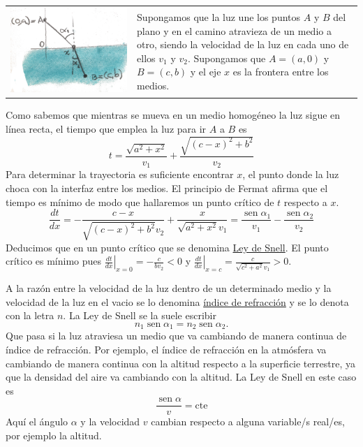 \documentclass{article}
\DeclareMathOperator{\sen}{sen}
\begin{document}
\begin{tabular}{m{4cm} m{7.5cm}}
 \includegraphics[scale=.07]{imagenes/refraccion.jpg} & Supongamos que la luz une los puntos $A$ y $B$ del plano y en el camino atravieza de un medio a otro, siendo la velocidad
 de la luz en cada uno de ellos $v_1$ y $v_2$.  Supongamos que $A=(a,0)$ y $B=(c,b)$ y el eje $x$ es la frontera entre los medios.
 \end{tabular}
Como sabemos que mientras se mueva en un medio homogéneo la luz sigue en línea recta,
el tiempo que emplea la luz para ir $A$ a $B$ es
 \[t=\frac{\sqrt{a^{2} + x^{2}}}{v_{1}} + \frac{\sqrt{{\left(c - x\right)}^{2} + b^{2}}}{v_{2}}\]
Para determinar la trayectoria es suficiente encontrar $x$, el punto donde la luz choca con la interfaz entre los medios. 
El principio de Fermat afirma que el tiempo es mínimo de modo que hallaremos un punto crítico de $t$ respecto a $x$. 
\[ \frac{dt}{dx}=-\frac{c - x}{\sqrt{{\left(c - x\right)}^{2} + b^{2}} v_{2}} +
\frac{x}{\sqrt{a^{2} + x^{2}} v_{1}}=\frac{\sen\alpha_1}{v_1}-\frac{\sen\alpha_2}{v_2} \]
Deducimos que en un punto crítico 
\boxedeq{\frac{\sen\alpha_1}{v_1}=\frac{\sen\alpha_2}{v_2} }{eq:ley_snell1}
que se denomina \href{http://es.wikipedia.org/wiki/Ley_de_Snell}{Ley de Snell}. El punto crítico es mínimo pues $\left.\frac{dt}{dx}\right|_{x=0}=-\tfrac{c}{bv_2}<0$ y
$\left.\frac{dt}{dx}\right|_{x=c}=\tfrac{c}{\sqrt{c^2+a^2}v_1}>0$.

 A la razón entre la velocidad de la luz dentro de un determinado medio y la velocidad de la luz en el vacio se lo denomina
\href{http://es.wikipedia.org/wiki/Índice_de_refracción}{índice de refracción} y se lo denota con la letra $n$. La Ley de Snell se la suele escribir
\[\boxed{n_1\sen\alpha_1=n_2\sen\alpha_2 }.\]
Que pasa si la luz atraviesa un medio que va cambiando de manera continua de índice de refracción. Por ejemplo, el índice de refracción en la atmósfera
va cambiando de manera continua con la altitud respecto a la superficie terrestre, ya que la densidad del aire va cambiando con la altitud. La Ley de
Snell en este caso es
\[\boxed{\frac{\sen\alpha}{v}=\text{cte}}\]
Aquí el ángulo $\alpha$ y la velocidad $v$ cambian respecto a alguna variable/s real/es, por ejemplo la altitud.
\end{document}
